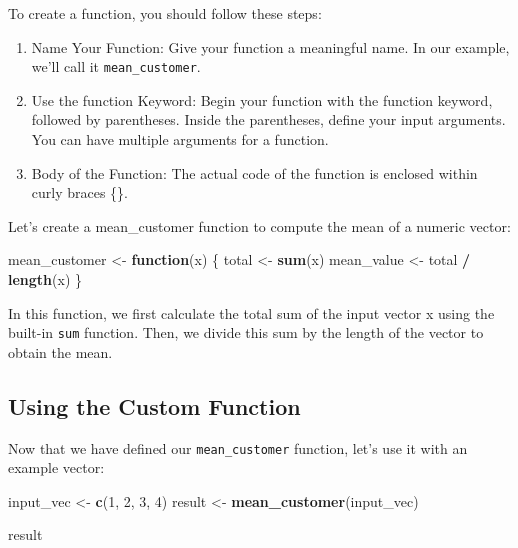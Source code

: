 \documentclass[
]{book}
\newenvironment{Shaded}{\begin{snugshade}}{\end{snugshade}}
\newcommand{\ControlFlowTok}[1]{\textcolor[rgb]{0.13,0.29,0.53}{\textbf{#1}}}
\newcommand{\DecValTok}[1]{\textcolor[rgb]{0.00,0.00,0.81}{#1}}
\newcommand{\FunctionTok}[1]{\textcolor[rgb]{0.13,0.29,0.53}{\textbf{#1}}}
\newcommand{\NormalTok}[1]{#1}
\newcommand{\OtherTok}[1]{\textcolor[rgb]{0.56,0.35,0.01}{#1}}
\newcommand{\SpecialCharTok}[1]{\textcolor[rgb]{0.81,0.36,0.00}{\textbf{#1}}}
\begin{document}
To create a function, you should follow these steps:

\begin{enumerate}
\def\labelenumi{\arabic{enumi}.}
\item
  Name Your Function: Give your function a meaningful name. In our example, we'll call it \texttt{mean\_customer}.
\item
  Use the function Keyword: Begin your function with the function keyword, followed by parentheses. Inside the parentheses, define your input arguments. You can have multiple arguments for a function.
\item
  Body of the Function: The actual code of the function is enclosed within curly braces \{\}.
\end{enumerate}

Let's create a mean\_customer function to compute the mean of a numeric vector:

\begin{Shaded}
\begin{Highlighting}[]
\NormalTok{mean\_customer }\OtherTok{\textless{}{-}} \ControlFlowTok{function}\NormalTok{(x) \{}
\NormalTok{  total }\OtherTok{\textless{}{-}} \FunctionTok{sum}\NormalTok{(x)}
\NormalTok{  mean\_value }\OtherTok{\textless{}{-}}\NormalTok{ total }\SpecialCharTok{/} \FunctionTok{length}\NormalTok{(x)}
\NormalTok{\}}
\end{Highlighting}
\end{Shaded}

In this function, we first calculate the total sum of the input vector x using the built-in \texttt{sum} function. Then, we divide this sum by the length of the vector to obtain the mean.

\hypertarget{using-the-custom-function}{%
\subsection{Using the Custom Function}\label{using-the-custom-function}}

Now that we have defined our \texttt{mean\_customer} function, let's use it with an example vector:

\begin{Shaded}
\begin{Highlighting}[]
\NormalTok{input\_vec }\OtherTok{\textless{}{-}} \FunctionTok{c}\NormalTok{(}\DecValTok{1}\NormalTok{, }\DecValTok{2}\NormalTok{, }\DecValTok{3}\NormalTok{, }\DecValTok{4}\NormalTok{)}
\NormalTok{result }\OtherTok{\textless{}{-}} \FunctionTok{mean\_customer}\NormalTok{(input\_vec)}

\NormalTok{result}
\end{Highlighting}
\end{Shaded}
\end{document}
